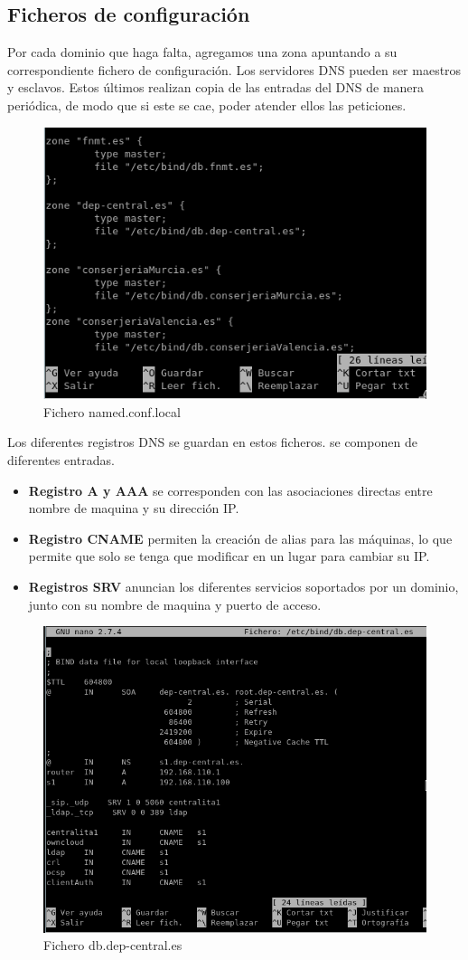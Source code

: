 \documentclass[a4paper]{article}
\begin{document}
\subsection{Ficheros de configuración}
Por cada dominio que haga falta, agregamos una zona apuntando a su correspondiente fichero de configuración. Los servidores DNS pueden ser maestros y esclavos. Estos últimos realizan copia de las entradas del DNS de manera periódica, de modo que si este se cae, poder atender ellos las peticiones.

\begin{figure}[htb]
	\centering
	\includegraphics[width=0.7\linewidth]{named_conf_local}
	\caption{Fichero named.conf.local}
	\label{fig:named}
\end{figure}

Los diferentes registros DNS se guardan en estos ficheros. se componen de diferentes entradas.

\begin{itemize}
	\item \textbf{Registro A y AAA} se corresponden con las asociaciones directas entre nombre de maquina y su dirección IP.
	\item \textbf{Registro CNAME} permiten la creación de alias para las máquinas, lo que permite que solo se tenga que modificar en un lugar para cambiar su IP.
	\item \textbf{Registros SRV} anuncian los diferentes servicios soportados por un dominio, junto con su nombre de maquina y puerto de acceso.
\end{itemize}
\begin{figure}
	\centering
	\includegraphics[width=0.7\linewidth]{Img/dn_dep-central_es.png}
	\caption{Fichero db.dep-central.es}
	\label{fig:db.dep-central.es}
\end{figure}
\end{document}
